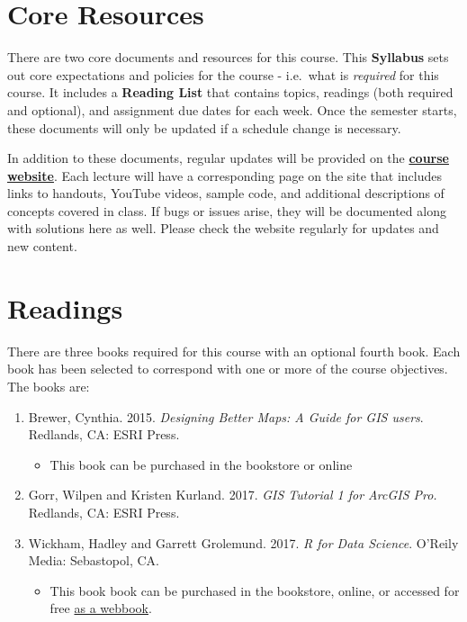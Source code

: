 \documentclass[
]{book}
\providecommand{\tightlist}{%
  \setlength{\itemsep}{0pt}\setlength{\parskip}{0pt}}
\begin{document}
\hypertarget{core-resources}{%
\section{Core Resources}\label{core-resources}}

There are two core documents and resources for this course. This \textbf{Syllabus} sets out core expectations and policies for the course - i.e.~what is \emph{required} for this course. It includes a \textbf{Reading List} that contains topics, readings (both required and optional), and assignment due dates for each week. Once the semester starts, these documents will only be updated if a schedule change is necessary.

In addition to these documents, regular updates will be provided on the \href{https://slu-soc5650.github.io}{\textbf{course website}}. Each lecture will have a corresponding page on the site that includes links to handouts, YouTube videos, sample code, and additional descriptions of concepts covered in class. If bugs or issues arise, they will be documented along with solutions here as well. Please check the website regularly for updates and new content.

\hypertarget{readings}{%
\section{Readings}\label{readings}}

There are three books required for this course with an optional fourth book. Each book has been selected to correspond with one or more of the course objectives. The books are:

\begin{enumerate}
\def\labelenumi{\arabic{enumi}.}
\tightlist
\item
  Brewer, Cynthia. 2015. \emph{Designing Better Maps: A Guide for GIS users}. Redlands, CA: ESRI Press.

  \begin{itemize}
  \tightlist
  \item
    This book can be purchased in the bookstore or online
  \end{itemize}
\item
  Gorr, Wilpen and Kristen Kurland. 2017. \emph{GIS Tutorial 1 for ArcGIS Pro.} Redlands, CA: ESRI Press.
\item
  Wickham, Hadley and Garrett Grolemund. 2017. \emph{R for Data Science}. O'Reily Media: Sebastopol, CA.

  \begin{itemize}
  \tightlist
  \item
    This book book can be purchased in the bookstore, online, or accessed for free \href{http://r4ds.had.co.nz}{as a webbook}.
  \end{itemize}
\end{enumerate}
\end{document}
